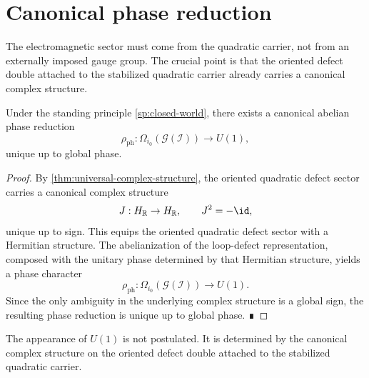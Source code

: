 \section{Canonical phase reduction}
\label{sec:em-phase-reduction}
The electromagnetic sector must come from the quadratic carrier, not
from an externally imposed gauge group.
The crucial point is that the oriented defect double attached to the
stabilized quadratic carrier already carries a canonical complex
structure.
\begin{theorem}
	\label{thm:em-phase-reduction}
	Under the standing principle \cref{sp:closed-world}, there exists a
	canonical abelian phase reduction
	\[
		\rho_{\mathrm{ph}}:\Omega_{i_0}(\mathcal G(\mathcal I))\longrightarrow U(1),
	\]
	unique up to global phase.
\end{theorem}
\begin{proof}
	By \cref{thm:universal-complex-structure}, the oriented quadratic defect
	sector carries a canonical complex structure
	\[
		J:H_{\mathbb R}\to H_{\mathbb R},
		\qquad
		J^2=-\id,
	\]
	unique up to sign.
	This equips the oriented quadratic defect sector with a Hermitian
	structure.
	The abelianization of the loop-defect representation, composed with the
	unitary phase determined by that Hermitian structure, yields a phase
	character
	\[
		\rho_{\mathrm{ph}}:\Omega_{i_0}(\mathcal G(\mathcal I))\to U(1).
	\]
	Since the only ambiguity in the underlying complex structure is a
	global sign, the resulting phase reduction is unique up to global
	phase. ∎
\end{proof}
\begin{remark}
	The appearance of \(U(1)\) is not postulated.
	It is determined by the canonical complex structure on the oriented
	defect double attached to the stabilized quadratic carrier.
\end{remark}

